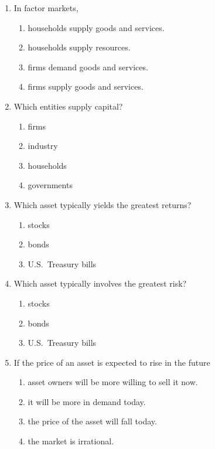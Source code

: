 \documentclass[
    letterpaper,paper=portrait,fleqn,
    DIV=16,fontsize=12pt,twoside=semi,
    parskip=full-,
    headings=standardclasses]
{scrartcl}
\begin{document}
\begin{enumerate}

\item In factor markets,
\vspace{-8pt}
\begin{enumerate}
\item households supply goods and services.
\item households supply resources.
\item firms demand goods and services.
\item firms supply goods and services.
\end{enumerate}

\item Which entities supply capital?
\vspace{-8pt}
\begin{enumerate}
\item firms
\item industry
\item households
\item governments
\end{enumerate}

\item Which asset typically yields the greatest returns?
\vspace{-8pt}
\begin{enumerate}
\item stocks
\item bonds
\item U.S.~Treasury bills
\end{enumerate}

\item Which asset typically involves the greatest risk?
\vspace{-8pt}
\begin{enumerate}
\item stocks
\item bonds
\item U.S.~Treasury bills
\end{enumerate}

\item If the price of an asset is expected to rise in the future
\vspace{-8pt}
\begin{enumerate}
\item asset owners will be more willing to sell it now.
\item it will be more in demand today.
\item the price of the asset will fall today.
\item the market is irrational.
\end{enumerate}


\end{enumerate}
\end{document}
